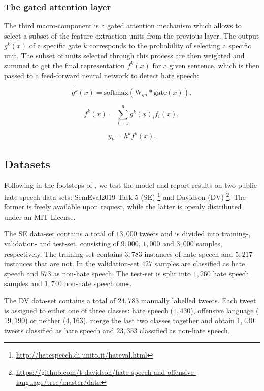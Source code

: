 \subsubsection{The gated attention layer}
    The third macro-component is a gated attention mechanism which allows to select a subset of the feature extraction units from the previous layer. The output $g^k(x)$ of a specific gate $k$ corresponds to the probability of selecting a specific unit. The subset of units selected through this process are then weighted and summed to get the final representation $f^k(x)$ for a given sentence, which is then passed to a feed-forward neural network to detect hate speech:
    
    \begin{equation}
        g^k(x) = \mathrm{softmax}(\mathrm{W}_{gn} * \mathrm{gate}(x)),
    \end{equation}
    
    \begin{equation}
        f^k(x) = \sum_{i=1}^{n} g^k(x)_i f_i(x),
    \end{equation}
    
    \begin{equation}
        y_k = h^k f^k(x).
    \end{equation}


\subsection{Datasets}
Following in the footsteps of \cite{original_zhou}, we test the model and report results on two public hate speech data-sets:
SemEval2019 Task-5 (SE) \cite{basile_semeval}%
\footnote{\url{http://hatespeech.di.unito.it/hateval.html}}
and Davidson (DV) \cite{davidson_2017}%
\footnote{\url{https://github.com/t-davidson/hate-speech-and-offensive-language/tree/master/data}}. The former is freely available upon request, while the latter is openly distributed under an MIT License.

The SE data-set contains a total of $13,000$ tweets and is divided into training-, validation- and test-set, consisting of $9,000$, $1,000$ and $3,000$ samples, respectively. The training-set contains $3,783$ instances of hate speech and $5,217$ instances that are not. In the validation-set $427$ samples are classified as hate speech and $573$ as non-hate speech. The test-set is split into $1,260$ hate speech samples and $1,740$ non-hate speech ones.

The DV data-set contains a total of $24,783$ manually labelled tweets. Each tweet is assigned to either one of three classes: hate speech ($1,430$), offensive language ($19,190$) or neither ($4,163$). \cite{original_zhou} merge the last two classes together and obtain $1,430$ tweets classified as hate speech and $23,353$ classified as non-hate speech.

